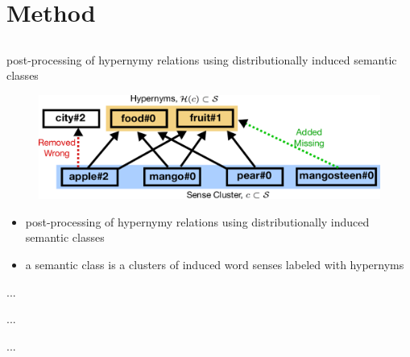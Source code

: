 \documentclass[usenames,dvipsnames]{beamer}
\begin{document}
\section{Method}
\subsection{}


\begin{frame}{ post-processing of hypernymy relations using distributionally induced semantic classes }

\begin{figure}[ht]
  \centering
  \includegraphics[width=.9\textwidth]{figures/coset}

\end{figure}

\begin{itemize}
\item post-processing of hypernymy relations using distributionally induced semantic classes
\item a semantic class is a clusters of induced word senses labeled with hypernyms

\end{itemize}



\end{frame}


\begin{frame}{ ... }

\end{frame}


\begin{frame}{ ... }

\end{frame}


\begin{frame}{ ... }

\end{frame}
\end{document}
